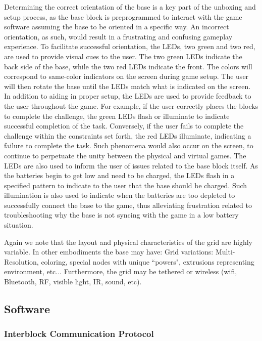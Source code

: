 \documentclass[]{article}
\begin{document}
Determining the correct orientation of the base is a key part of the unboxing and setup process, as the base block is preprogrammed to interact with the game software assuming the base to be oriented in a specific way.  An incorrect orientation, as such, would result in a frustrating and confusing gameplay experience.   To facilitate successful orientation, the LEDs, two green and two red, are used to provide visual cues to the user.  The two green LEDs indicate the back side of the base, while the two red LEDs indicate the front.  The colors will correspond to same-color indicators on the screen during game setup.  The user will then rotate the base until the LEDs match what is indicated on the screen.
In addition to aiding in proper setup, the LEDs are used to provide feedback to the user throughout the game.  For example, if the user correctly places the blocks to complete the challenge, the green LEDs flash or illuminate to indicate successful completion of the task.  Conversely, if the user fails to complete the challenge within the constraints set forth, the red LEDs illuminate, indicating a failure to complete the task.  Such phenomena would also occur on the screen, to continue to perpetuate the unity between the physical and virtual games.
The LEDs are also used to inform the user of issues related to the base block itself.  As the batteries begin to get low and need to be charged, the LEDs flash in a specified pattern to indicate to the user that the base should be charged.  Such illumination is also used to indicate when the batteries are too depleted to successfully connect the base to the game, thus alleviating frustration related to troubleshooting why the base is not syncing with the game in a low battery situation.

Again we note that the layout and physical characteristics of the grid are highly variable. In other embodiments the base may have:
Grid variations: Multi-Resolution, coloring, special nodes with unique ``powers", extrusions representing environment, etc... Furthermore, the grid may be tethered or wireless (wifi, Bluetooth, RF, visible light, IR, sound, etc).


\subsection{Software}
\subsubsection{Interblock Communication Protocol}

\end{document}
